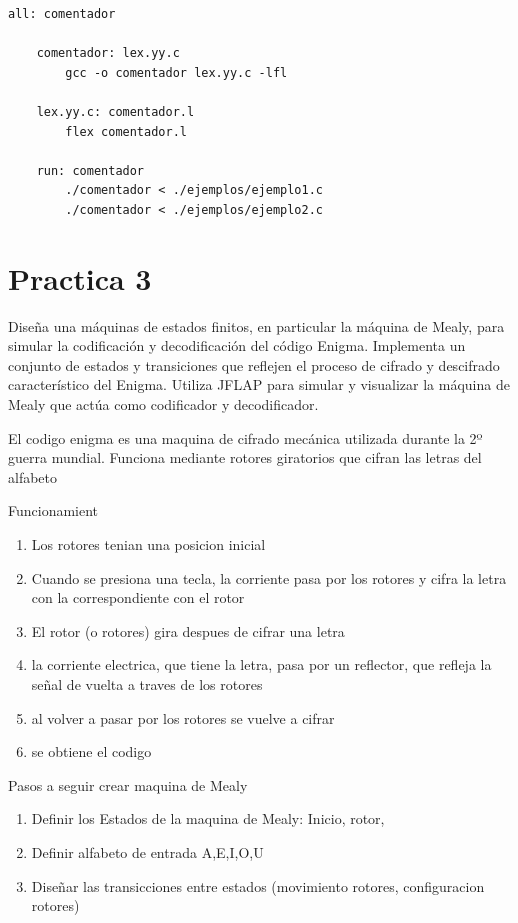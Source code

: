 \documentclass{article}
\begin{document}
        \lstset{language=bash, breaklines=true, basicstyle=\footnotesize}
        \begin{lstlisting}[frame=single, caption={Makefile}]        
    all: comentador

    comentador: lex.yy.c
        gcc -o comentador lex.yy.c -lfl
            
    lex.yy.c: comentador.l
        flex comentador.l
            
    run: comentador
        ./comentador < ./ejemplos/ejemplo1.c
        ./comentador < ./ejemplos/ejemplo2.c
        \end{lstlisting}

    \newpage

    \section*{Practica 3}
    Diseña una máquinas de estados finitos, en particular la máquina de Mealy, para simular la codificación y decodificación del código Enigma. Implementa un conjunto de estados y transiciones que reflejen el proceso de cifrado y descifrado característico del Enigma. Utiliza JFLAP para simular y visualizar la máquina de Mealy que actúa como codificador y decodificador.

    El codigo enigma es una maquina de cifrado mecánica utilizada durante la 2º guerra mundial.
    Funciona mediante rotores giratorios que cifran las letras del alfabeto 

    Funcionamient
    \begin{enumerate}
        \item Los rotores tenian una posicion inicial 
        \item Cuando se presiona una tecla, la corriente pasa por los rotores y cifra la letra con la correspondiente con el rotor
        \item El rotor (o rotores) gira despues de cifrar una letra 
        \item la corriente electrica, que tiene la letra, pasa por un reflector, que refleja la señal de vuelta a traves de los rotores
        \item al volver a pasar por los rotores se vuelve a cifrar
        \item se obtiene el codigo 
    \end{enumerate}


    Pasos a seguir crear maquina de Mealy
    \begin{enumerate}
     \item Definir los Estados de la maquina de Mealy: Inicio, rotor, 
     \item Definir alfabeto de entrada {A,E,I,O,U}
     \item Diseñar las transicciones entre estados (movimiento rotores, configuracion rotores)
    \end{enumerate}    

    
\end{document}
